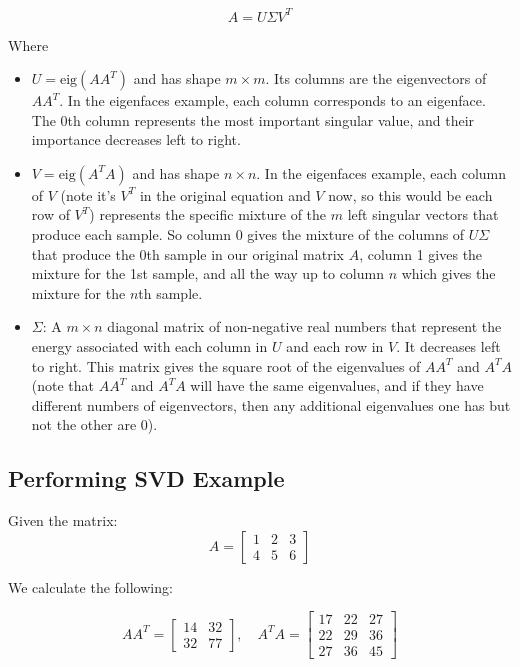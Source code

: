\documentclass[12pt]{article}
\begin{document}
\[A = U\Sigma V^T\]

Where
\begin{itemize}
\item \(U = \text{eig}(AA^T)\) and has shape \(m \times m\). Its columns are the eigenvectors of \(AA^T\). In the eigenfaces example, each column corresponds to an eigenface. The 0th column represents the most important singular value, and their importance decreases left to right.
\item \(V = \text{eig}(A^TA)\) and has shape \(n \times n\). In the eigenfaces example, each column of \(V\) (note it's \(V^T\) in the original equation and \(V\) now, so this would be each row of \(V^T\)) represents the specific mixture of the \(m\) left singular vectors that produce each sample. So column 0 gives the mixture of the columns of \(U\Sigma\) that produce the 0th sample in our original matrix \(A\), column 1 gives the mixture for the 1st sample, and all the way up to column \(n\) which gives the mixture for the \(n\)th sample.
\item \(\Sigma\): A \(m \times n\) diagonal matrix of non-negative real numbers that represent the energy associated with each column in \(U\) and each row in \(V\). It decreases left to right. This matrix gives the square root of the eigenvalues of \(AA^T\) and \(A^TA\) (note that \(AA^T\) and \(A^TA\) will have the same eigenvalues, and if they have different numbers of eigenvectors, then any additional eigenvalues one has but not the other are 0).
\end{itemize}

\subsection{Performing SVD Example}

Given the matrix:
\[
A = 
\begin{bmatrix}
1 & 2 & 3 \\
4 & 5 & 6
\end{bmatrix}
\]

We calculate the following:

\[
AA^T =
\begin{bmatrix}
14 & 32 \\
32 & 77
\end{bmatrix},
\quad
A^TA =
\begin{bmatrix}
17 & 22 & 27 \\
22 & 29 & 36 \\
27 & 36 & 45
\end{bmatrix}
\]
\end{document}

